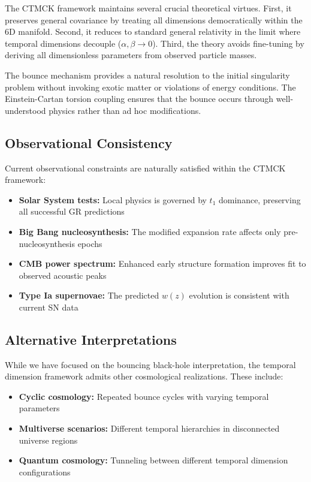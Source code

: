 \documentclass[reprint,amsmath,amssymb,aps,prd,nofootinbib,longbibliography]{revtex4-2}
\begin{document}
The CTMCK framework maintains several crucial theoretical virtues. First, it preserves general covariance by treating all dimensions democratically within the 6D manifold. Second, it reduces to standard general relativity in the limit where temporal dimensions decouple ($\alpha, \beta \to 0$). Third, the theory avoids fine-tuning by deriving all dimensionless parameters from observed particle masses.

The bounce mechanism provides a natural resolution to the initial singularity problem without invoking exotic matter or violations of energy conditions. The Einstein-Cartan torsion coupling ensures that the bounce occurs through well-understood physics rather than ad hoc modifications.

\subsection{Observational Consistency}

Current observational constraints are naturally satisfied within the CTMCK framework:

\begin{itemize}
\item \textbf{Solar System tests:} Local physics is governed by $t_1$ dominance, preserving all successful GR predictions
\item \textbf{Big Bang nucleosynthesis:} The modified expansion rate affects only pre-nucleosynthesis epochs
\item \textbf{CMB power spectrum:} Enhanced early structure formation improves fit to observed acoustic peaks
\item \textbf{Type Ia supernovae:} The predicted $w(z)$ evolution is consistent with current SN data
\end{itemize}

\subsection{Alternative Interpretations}

While we have focused on the bouncing black-hole interpretation, the temporal dimension framework admits other cosmological realizations. These include:

\begin{itemize}
\item \textbf{Cyclic cosmology:} Repeated bounce cycles with varying temporal parameters
\item \textbf{Multiverse scenarios:} Different temporal hierarchies in disconnected universe regions
\item \textbf{Quantum cosmology:} Tunneling between different temporal dimension configurations
\end{itemize}
\end{document}
